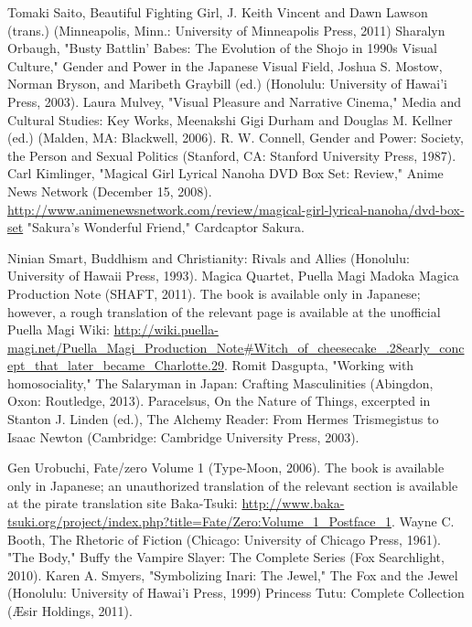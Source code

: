 \begin{thebibliography}{200}
    Tomaki Saito, Beautiful Fighting Girl, J. Keith Vincent and Dawn Lawson (trans.) (Minneapolis, Minn.: University of Minneapolis Press, 2011)
    Sharalyn Orbaugh, "Busty Battlin' Babes: The Evolution of the Shojo in 1990s Visual Culture," Gender and Power in the Japanese Visual Field, Joshua S. Mostow, Norman Bryson, and Maribeth Graybill (ed.) (Honolulu: University of Hawai'i Press, 2003).
    Laura Mulvey, "Visual Pleasure and Narrative Cinema," Media and Cultural Studies: Key Works, Meenakshi Gigi Durham and Douglas M. Kellner (ed.) (Malden, MA: Blackwell, 2006).
    R. W. Connell, Gender and Power: Society, the Person and Sexual Politics (Stanford, CA: Stanford University Press, 1987).
    Carl Kimlinger, "Magical Girl Lyrical Nanoha DVD Box Set: Review," Anime News Network (December 15, 2008). \url{http://www.animenewsnetwork.com/review/magical-girl-lyrical-nanoha/dvd-box-set}
    "Sakura's Wonderful Friend," Cardcaptor Sakura.

    Ninian Smart, Buddhism and Christianity: Rivals and Allies (Honolulu: University of Hawaii Press, 1993).
    Magica Quartet, Puella Magi Madoka Magica Production Note (SHAFT, 2011). The book is available only in Japanese; however, a rough translation of the relevant page is available at the unofficial Puella Magi Wiki: \url{http://wiki.puella-magi.net/Puella_Magi_Production_Note#Witch_of_cheesecake_.28early_concept_that_later_became_Charlotte.29}.
    Romit Dasgupta, "Working with homosociality," The Salaryman in Japan: Crafting Masculinities (Abingdon, Oxon: Routledge, 2013).
    Paracelsus, On the Nature of Things, excerpted in Stanton J. Linden (ed.), The Alchemy Reader: From Hermes Trismegistus to Isaac Newton (Cambridge: Cambridge University Press, 2003).

    Gen Urobuchi, Fate/zero Volume 1 (Type-Moon, 2006). The book is available only in Japanese; an unauthorized translation of the relevant section is available at the pirate translation site Baka-Tsuki: \url{http://www.baka-tsuki.org/project/index.php?title=Fate/Zero:Volume_1_Postface_1}.
    Wayne C. Booth, The Rhetoric of Fiction (Chicago: University of Chicago Press, 1961).
    "The Body," Buffy the Vampire Slayer: The Complete Series (Fox Searchlight, 2010).
    Karen A. Smyers, "Symbolizing Inari: The Jewel," The Fox and the Jewel (Honolulu: University of Hawai'i Press, 1999)
    Princess Tutu: Complete Collection (Æsir Holdings, 2011).


\end{thebibliography}

